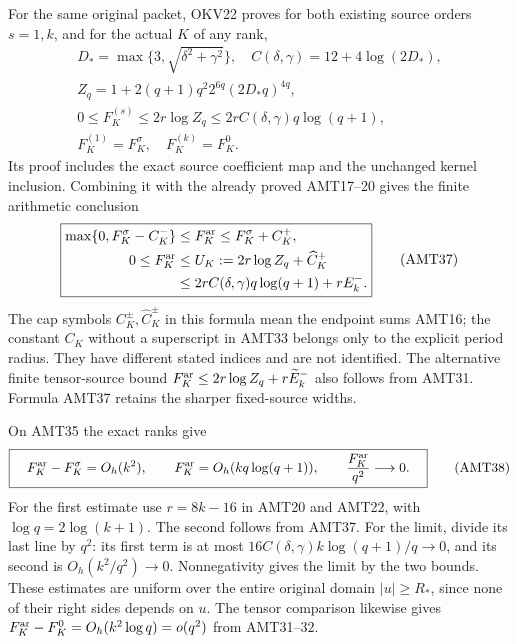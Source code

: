 \documentclass[11pt,a4paper]{article}
\begin{document}
For the same original packet, OKV22 proves for both existing source
orders $s=1,k$, and for the actual $K$ of any rank,
\[
\begin{gathered}
 D_*=\max\{3,\sqrt{\delta^2+\gamma^2}\},\quad
 C(\delta,\gamma)=12+4\log(2D_*),\\
 Z_q=1+2(q+1)q^2 2^{6q}(2D_*q)^{4q},\\
 0\le F_K^{(s)}\le2r\log Z_q
                \le2r C(\delta,\gamma)q\log(q+1),
 \\ F_K^{(1)}=F_K^\sigma,\quad F_K^{(k)}=F_K^0.
\end{gathered}\tag{AMT36}
\]
Its proof includes the exact source coefficient map and the unchanged
kernel inclusion. Combining it with the already proved AMT17--20
gives the finite arithmetic conclusion
\[
\boxed{\begin{aligned}
 \max\{0,F_K^\sigma-C_K^-\}
       &\le F_K^{\rm ar}\le F_K^\sigma+C_K^+,\\
 0\le F_K^{\rm ar}
       &\le U_K:=2r\log Z_q+\widehat C_K^+\\
       &\le2r C(\delta,\gamma)q\log(q+1)+rE_k^-.
\end{aligned}}\tag{AMT37}
\]
The cap symbols $C_K^\pm,\widehat C_K^\pm$ in this formula mean
the endpoint sums AMT16; the constant $C_K$ without a superscript
in AMT33 belongs only to the explicit period radius. They have
different stated indices and are not identified.
The alternative finite tensor-source bound
$F_K^{\rm ar}\le2r\log Z_q+r\widetilde E_k^-$ also follows from
AMT31. Formula AMT37 retains the sharper fixed-source widths.

On AMT35 the exact ranks give
\[
 \boxed{\quad F_K^{\rm ar}-F_K^\sigma=O_h(k^2),\qquad
 F_K^{\rm ar}=O_h(kq\log(q+1)),\qquad
 \frac{F_K^{\rm ar}}{q^2}\longrightarrow0.\quad}
 \tag{AMT38}
\]
For the first estimate use $r=8k-16$ in AMT20 and AMT22,
with $\log q=2\log(k+1)$. The second follows from AMT37.
For the limit, divide its last line by $q^2$: its first term is
at most $16C(\delta,\gamma)k\log(q+1)/q\to0$, and its second
is $O_h(k^2/q^2)\to0$. Nonnegativity gives the limit by the two
bounds. These estimates are uniform over the entire original
domain $|u|\ge R_*$, since none of their right sides depends on $u$.
The tensor comparison likewise gives
$F_K^{\rm ar}-F_K^0=O_h(k^2\log q)=o(q^2)$ from AMT31--32.
\end{document}
